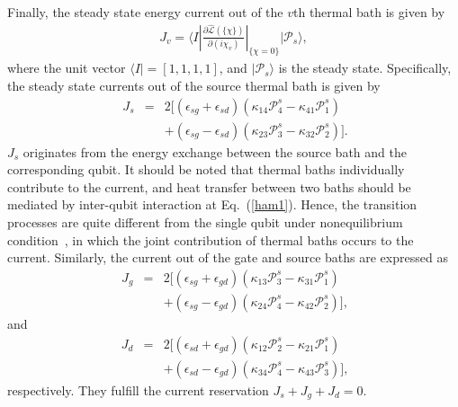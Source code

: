 \documentclass[twocolumn,preprintnumbers,amsmath,amssymb]{revtex4}
\begin{document}
Finally, the steady state energy current out of the $v$th thermal bath is given by
\begin{eqnarray}
J_v={\langle}I|\frac{{\partial}\mathcal{\hat{L}}(\{\chi\})}{{\partial}(i\chi_v)}|_{\{\chi=0\}}|\mathcal{P}_{s}{\rangle},
\end{eqnarray}
where the unit vector ${\langle}I|=[1,1,1,1]$, and $|\mathcal{P}_{s}{\rangle}$ is the steady state.
Specifically, the steady state currents out of the source thermal bath is given by
\begin{eqnarray}~\label{jl1}
J_s&=&2[(\epsilon_{sg}+\epsilon_{sd})(\kappa_{14}\mathcal{P}^{s}_4-\kappa_{41}\mathcal{P}^{s}_1)\nonumber\\
&&+(\epsilon_{sg}-\epsilon_{sd})(\kappa_{23}\mathcal{P}^{s}_3-\kappa_{32}\mathcal{P}^{s}_2)].
\end{eqnarray}
$J_s$ originates from the energy exchange between the source bath and the corresponding qubit.
It should be noted that thermal baths individually contribute to the current,
and heat transfer between two baths should be mediated by inter-qubit interaction at Eq.~(\ref{ham1}).
Hence, the transition processes are quite different from the single qubit under nonequilibrium condition~\cite{dvirasegal2006prb,tianchen2013prb},
in which the joint contribution of thermal baths occurs to the current.
Similarly, the current out of the gate and source baths are expressed as
\begin{eqnarray}~\label{jm1}
J_g&=&2[(\epsilon_{sg}+\epsilon_{gd})(\kappa_{13}\mathcal{P}^{s}_3-\kappa_{31}\mathcal{P}^{s}_1)\nonumber\\
&&+(\epsilon_{sg}-\epsilon_{gd})(\kappa_{24}\mathcal{P}^{s}_4-\kappa_{42}\mathcal{P}^{s}_2)],
\end{eqnarray}
and
\begin{eqnarray}~\label{jr1}
J_d&=&2[(\epsilon_{sd}+\epsilon_{gd})(\kappa_{12}\mathcal{P}^{s}_2-\kappa_{21}\mathcal{P}^{s}_1)\nonumber\\
&&+(\epsilon_{sd}-\epsilon_{gd})(\kappa_{34}\mathcal{P}^{s}_4-\kappa_{43}\mathcal{P}^{s}_3)],
\end{eqnarray}
respectively.
They fulfill the current reservation $J_s+J_g+J_d=0$.
\end{document}
